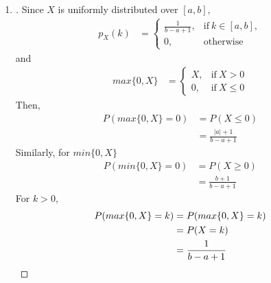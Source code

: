 \documentclass[paper=usletter, fontsize=12pt]{article}
\begin{document}
\begin{enumerate}
\begin{proof}[\unskip\nopunct]
\begin{enumerate}
            \end{enumerate}

        \end{proof}
        \vspace{0.2in}

        \item
        \begin{proof}[\unskip\nopunct]
            Since $X$ is uniformly distributed over $[a, b]$,
            \begin{align*}
                p_X(k) & =
                \begin{cases}
                    \frac{1}{b-a+1}, & \text{if}\ k \in [a,b],\\
                    0, & \text{otherwise}
                \end{cases}
            \end{align*}
            and
            \begin{align*}
                max\{0,X\} & =
                \begin{cases}
                    X, & \text{if}\ X > 0\\
                    0, & \text{if}\ X \le 0
                \end{cases}
            \end{align*}
            Then,
            \begingroup
            \addtolength{\jot}{1em}
            \begin{align*}
                P(max\{0,X\} = 0) & = P(X \le 0)\\
                & = \frac{|a| + 1}{b - a + 1}
            \end{align*}
            \endgroup
            Similarly, for $min\{0,X\}$
            \begingroup
            \addtolength{\jot}{1em}
            \begin{align*}
                P(min\{0,X\} = 0) & = P(X \ge 0)\\
                & = \frac{b + 1}{b - a + 1}
            \end{align*}
            \endgroup
            For $k > 0$,
            \begingroup
            \addtolength{\jot}{1em}
            \begin{align*}
                P(max\{0,X\} = k) & = P(max\{0,X\} = k)\\
                & = P(X = k)\\
                & = \frac{1}{b - a + 1} \qedhere
            \end{align*}
            \endgroup
        \end{proof}
        \vspace{0.2in}


\end{enumerate}
\end{document}
